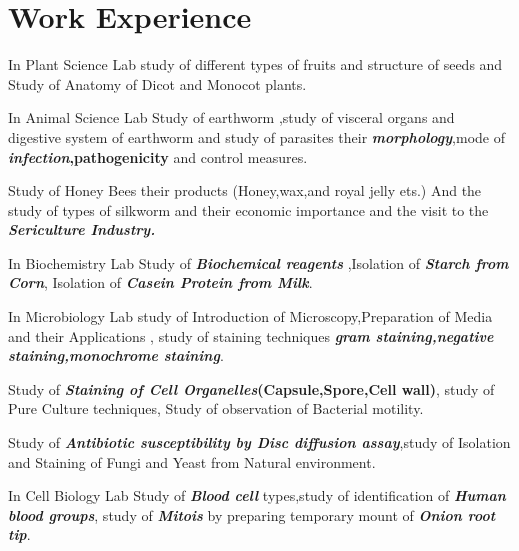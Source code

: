 \documentclass[]{dhirendra-pratap-singh-resume}
\begin{document}
\hfill
\begin{minipage}[t]{0.66\textwidth}


\section{Work Experience}
\runsubsection{}
\vspace{\topsep}
\begin{tightemize}
\item In Plant Science Lab study of different types of fruits and structure of seeds  
% 
\textbf{\textit{}} and Study of Anatomy of Dicot and Monocot plants.
\item In Animal Science Lab Study of earthworm ,study of visceral organs and digestive system  of earthworm\textbf{} and study of parasites their \textit{\textbf{morphology}},mode of \textbf{\textit{infection},pathogenicity} and control measures.
\item Study of Honey Bees their products (Honey,wax,and royal jelly ets.)  And the study of types of silkworm and their economic importance and the visit to the \textbf{\textit{Sericulture Industry.}}
\item In Biochemistry Lab Study of\textbf{\textit{ Biochemical reagents}} \textbf{} ,Isolation of \textbf{\textit{Starch from Corn}}, Isolation of\textbf{\textit{ Casein Protein from Milk}}.
\item In Microbiology Lab study of Introduction of Microscopy,Preparation of Media and their Applications \textbf{}, study of staining techniques \textbf{\textit{gram staining,negative staining,monochrome staining}}.
\item Study of\textbf{\textit{ Staining of Cell Organelles}(Capsule,Spore,Cell wall)}, \textbf{} study of Pure Culture techniques, Study of observation of Bacterial motility.
\item Study of\textbf{\textit{ Antibiotic susceptibility by Disc diffusion assay}},study of Isolation and Staining of Fungi and Yeast from Natural environment.
\item In Cell Biology Lab Study of\textbf{\textit{ Blood cell}} types,study of identification of\textbf{\textit{ Human blood groups}}, \textbf{} study of \textbf{\textit{Mitois}} by preparing temporary mount of\textbf{\textit{ Onion root tip}}.

\end{tightemize}
\end{minipage}
\end{document}
